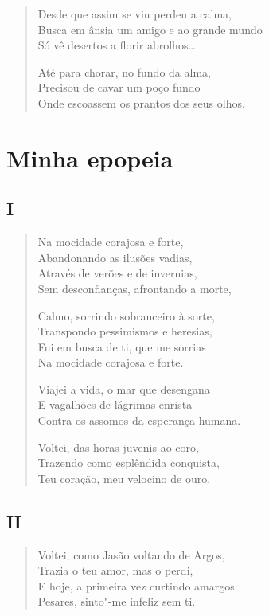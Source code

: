 {\begin{verse}
Desde que assim se viu perdeu a calma,\\
Busca em ânsia um amigo e ao grande mundo\\
Só vê desertos a florir abrolhos\ldots{}

Até para chorar, no fundo da alma,\\
Precisou de cavar um poço fundo\\
Onde escoassem os prantos dos seus olhos.
\end{verse}

\chapter{Minha epopeia}

\section*{I}

\begin{verse}
Na mocidade corajosa e forte,\\
Abandonando as ilusões vadias,\\
Através de verões e de invernias,\\
Sem desconfianças, afrontando a morte,

Calmo, sorrindo sobranceiro à sorte,\\
Transpondo pessimismos e heresias,\\
Fui em busca de ti, que me sorrias\\
Na mocidade corajosa e forte.

Viajei a vida, o mar que desengana\\
E vagalhões de lágrimas enrista\\
Contra os assomos da esperança humana.

Voltei, das horas juvenis ao coro,\\
Trazendo como esplêndida conquista,\\
Teu coração, meu velocino de ouro.
\end{verse}

\medskip
\section*{II}

\begin{verse}
Voltei, como Jasão voltando de Argos,\\
Trazia o teu amor, mas o perdi,\\
E hoje, a primeira vez curtindo amargos\\
Pesares, sinto"-me infeliz sem ti.


\end{verse}}
